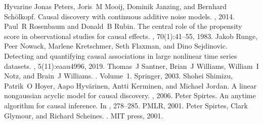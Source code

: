 \documentclass[letterpaper,10pt,english]{jupyterBook}
\begin{document}
\begin{sphinxthebibliography}{Hyvarine}
\sphinxAtStartPar
Jonas Peters, Joris M Mooij, Dominik Janzing, and Bernhard Schölkopf. Causal discovery with continuous additive noise models. , 2014.
\sphinxAtStartPar
Paul R Rosenbaum and Donald B Rubin. The central role of the propensity score in observational studies for causal effects. , 70(1):41–55, 1983.
\sphinxAtStartPar
Jakob Runge, Peer Nowack, Marlene Kretschmer, Seth Flaxman, and Dino Sejdinovic. Detecting and quantifying causal associations in large nonlinear time series datasets. , 5(11):eaau4996, 2019.
\sphinxAtStartPar
Thomas J Santner, Brian J Williams, William I Notz, and Brain J Williams. . Volume 1. Springer, 2003.
\sphinxAtStartPar
Shohei Shimizu, Patrik O Hoyer, Aapo Hyvärinen, Antti Kerminen, and Michael Jordan. A linear non\sphinxhyphen{}gaussian acyclic model for causal discovery. , 2006.
\sphinxAtStartPar
Peter Spirtes. An anytime algorithm for causal inference. In , 278–285. PMLR, 2001.
\sphinxAtStartPar
Peter Spirtes, Clark Glymour, and Richard Scheines. . MIT press, 2001.
\end{sphinxthebibliography}







\renewcommand{\indexname}{Index}
\printindex
\end{document}
